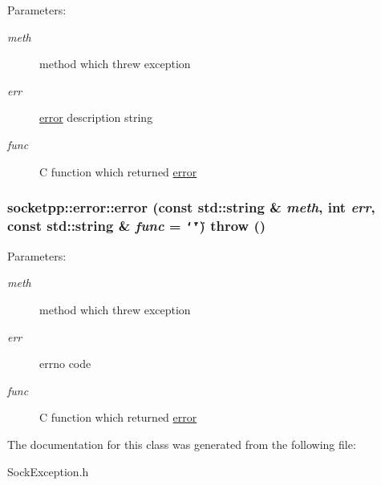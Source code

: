 \begin{Desc}
\item[Parameters:]
\begin{description}
\item[{\em meth}]method which threw exception \item[{\em err}]\hyperlink{classsocketpp_1_1error}{error} description string \item[{\em func}]C function which returned \hyperlink{classsocketpp_1_1error}{error} \end{description}
\end{Desc}
\hypertarget{classsocketpp_1_1error_1287e8ec1ff5f7b18d91ea65c2505ae8}{
\subsubsection{\setlength{\rightskip}{0pt plus 5cm}socketpp::error::error (const std::string \& {\em meth}, \/  int {\em err}, \/  const std::string \& {\em func} = {\tt \char`\"{}\char`\"{}})  throw ()}}
\label{classsocketpp_1_1error_1287e8ec1ff5f7b18d91ea65c2505ae8}


\begin{Desc}
\item[Parameters:]
\begin{description}
\item[{\em meth}]method which threw exception \item[{\em err}]errno code \item[{\em func}]C function which returned \hyperlink{classsocketpp_1_1error}{error} \end{description}
\end{Desc}


The documentation for this class was generated from the following file:\begin{CompactItemize}
\item 
SockException.h\end{CompactItemize}
